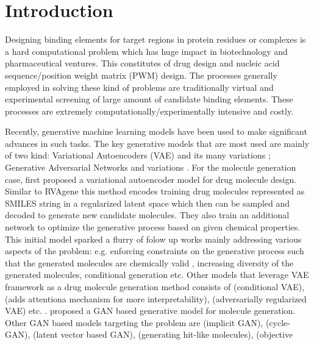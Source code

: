 \section{Introduction} 

Designing binding elements for target regions in protein residues or complexes is a hard
computational problem  which has huge impact in biotechnology and pharmaceutical ventures.
This constitutes of drug design and nucleic acid sequence/position weight matrix (PWM)
design. The processes generally employed in solving these kind of problems are traditionally virtual and
experimental screening of large amount of candidate binding elements. These processes are extremely
computationally/experimentally intensive and costly. 
\par
Recently, generative machine learning models have
been used to make significant advances in such tasks. The key generative models that are most
used are mainly of two kind: Variational Autoencoders (VAE) \citep{Kingma2014} and its many
variations \citep{higgins2016beta, sohn2015learning,dilokthanakul2016deep}; Generative Adversarial
Networks \citep{goodfellow2014generative} and variations \citep{wang2018high,zhu2017unpaired}.
For the molecule generation case, \citet{gomez2018automatic} first proposed a variational autoencoder model for drug molecule design.
Similar to RVAgene  this method encodes training drug molecules represented as SMILES
\citep{weininger1988smiles} string in a regularized latent space which then can be sampled and
decoded to generate new candidate molecules. They also train an additional network to optimize the
generative process based on given chemical properties. This initial model sparked a flurry of folow up 
works mainly addressing various aspects of the problem: e.g. enforcing constraints on the generative process 
such that the generated molecules are chemically valid \citet{kusner2017grammar}, increasing diversity of the generated
molecules, conditional generation etc.  Other models that leverage VAE framework as a drug molecule
generation method consists of \citet{lim2018molecular} (conditional VAE), \citet{dollar2021giving}
(adds attentiona mechanism for more interpretability), \citet{hong2019molecular} (adversarially
regularized VAE) etc. . \citet{kadurin2017drugan} proposed a GAN based generative model
for molecule generation. Other GAN based models
targeting the problem are \citep{de2018molgan} (implicit GAN), \citep{maziarka2020mol} (cycle-GAN), \citet{prykhodko2019novo} (latent vector based GAN), 
\citet{mendez2020novo} (generating hit-like molecules), \citet{guimaraes2017objective} (objective
